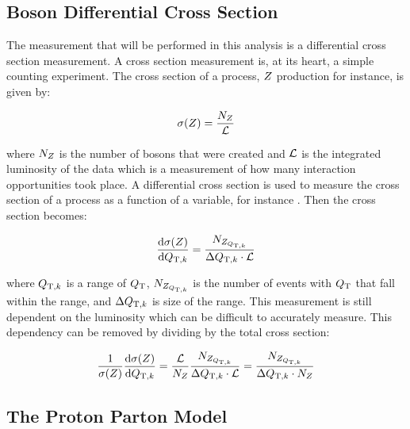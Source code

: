 
\subsection{\texorpdfstring{\Z}{Z} Boson Differential Cross Section}

The measurement that will be performed in this analysis is a differential cross
section measurement. A cross section measurement is, at its heart, a simple
counting experiment. The cross section of a process, $Z$ production for
instance, is given by:

\begin{equation}\label{eq:xsec}
    \sigma(Z) = \frac{N_{Z}}{\mathcal{L}}
\end{equation}

where $N_{Z}$ is the number of \Z bosons that were created and $\mathcal{L}$
is the integrated luminosity of the data which is a measurement of how many
interaction opportunities took place. A differential cross section is used to
measure the cross section of a process as a function of a variable, for
instance \bosonpt. Then the cross section becomes:

\begin{equation}\label{eq:differ_xsec}
    \frac{\text{d}\sigma(Z)}{\text{d}Q_{\mathrm{T},k} }
    =
    \frac{N_{Z_{Q_{\mathrm{T},k}}}}{\Delta Q_{\mathrm{T},k} \cdot \mathcal{L}}
\end{equation}

where $Q_{\mathrm{T},k}$ is a range of $Q_{\mathrm{T}}$, $N_{Z_{Q_{\mathrm{T},k}}}$ is the number
of \Z events with $Q_{\mathrm{T}}$ that fall within the range, and $\Delta Q_{\mathrm{T},k}$
is size of the range. This measurement is still dependent on the luminosity
which can be difficult to accurately measure. This dependency can be removed by
dividing by the total cross section:

\begin{equation}\label{eq:normaized_differ_xsec}
    \frac{1}{\sigma(Z)} \frac{\text{d}\sigma(Z)}{\text{d}Q_{\mathrm{T},k} }
    =
    \frac{\mathcal{L}}{N_{Z}} \frac{N_{Z_{Q_{\mathrm{T},k}}}}{\Delta Q_{\mathrm{T},k} \cdot \mathcal{L}}
    =
    \frac{N_{Z_{Q_{\mathrm{T},k}}}}{\Delta Q_{\mathrm{T},k} \cdot N_{Z}}
\end{equation}

\subsection{The Proton Parton Model}
\label{ssec:parton_model}

